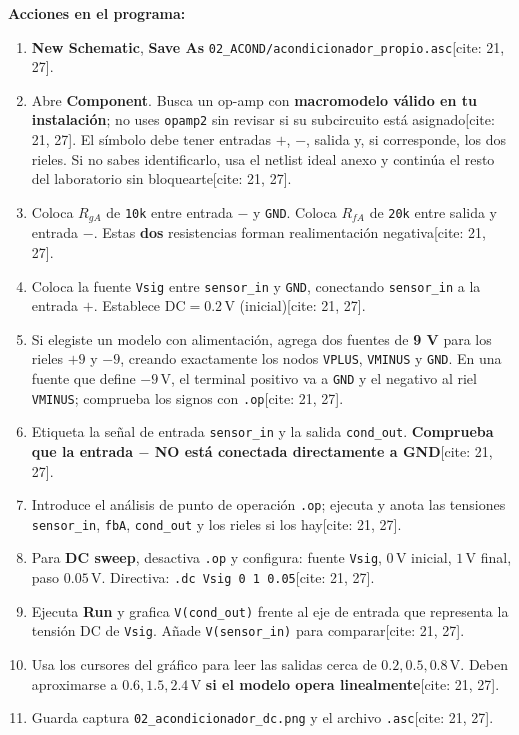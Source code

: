 \documentclass[10pt, a4paper]{article}
\begin{document}
\textbf{Acciones en el programa:}
\begin{enumerate}[noitemsep, leftmargin=*]
    \item \textbf{New Schematic}, \textbf{Save As} \texttt{02\_ACOND/acondicionador\_propio.asc}[cite: 21, 27].
    \item Abre \textbf{Component}. Busca un op-amp con \textbf{macromodelo válido en tu instalación}; no uses \texttt{opamp2} sin revisar si su subcircuito está asignado[cite: 21, 27]. El símbolo debe tener entradas $+$, $-$, salida y, si corresponde, los dos rieles. Si no sabes identificarlo, usa el netlist ideal anexo y continúa el resto del laboratorio sin bloquearte[cite: 21, 27].
    \item Coloca $R_{gA}$ de \texttt{10k} entre entrada $-$ y \texttt{GND}. Coloca $R_{fA}$ de \texttt{20k} entre salida y entrada $-$. Estas \textbf{dos} resistencias forman realimentación negativa[cite: 21, 27].
    \item Coloca la fuente \texttt{Vsig} entre \texttt{sensor\_in} y \texttt{GND}, conectando \texttt{sensor\_in} a la entrada $+$. Establece $\text{DC} = 0.2\,\text{V}$ (inicial)[cite: 21, 27].
    \item Si elegiste un modelo con alimentación, agrega dos fuentes de \textbf{9 V} para los rieles $+9$ y $-9$, creando exactamente los nodos \texttt{VPLUS}, \texttt{VMINUS} y \texttt{GND}. En una fuente que define $-9\,\text{V}$, el terminal positivo va a \texttt{GND} y el negativo al riel \texttt{VMINUS}; comprueba los signos con \texttt{.op}[cite: 21, 27].
    \item Etiqueta la señal de entrada \texttt{sensor\_in} y la salida \texttt{cond\_out}. \textbf{Comprueba que la entrada $-$ NO está conectada directamente a GND}[cite: 21, 27].
    \item Introduce el análisis de punto de operación \texttt{.op}; ejecuta y anota las tensiones \texttt{sensor\_in}, \texttt{fbA}, \texttt{cond\_out} y los rieles si los hay[cite: 21, 27].
    \item Para \textbf{DC sweep}, desactiva \texttt{.op} y configura: fuente \texttt{Vsig}, $0\,\text{V}$ inicial, $1\,\text{V}$ final, paso $0.05\,\text{V}$. Directiva: \texttt{.dc Vsig 0 1 0.05}[cite: 21, 27].
    \item Ejecuta \textbf{Run} y grafica \texttt{V(cond\_out)} frente al eje de entrada que representa la tensión DC de \texttt{Vsig}. Añade \texttt{V(sensor\_in)} para comparar[cite: 21, 27].
    \item Usa los cursores del gráfico para leer las salidas cerca de $0.2, 0.5, 0.8\,\text{V}$. Deben aproximarse a $0.6, 1.5, 2.4\,\text{V}$ \textbf{si el modelo opera linealmente}[cite: 21, 27].
    \item Guarda captura \texttt{02\_acondicionador\_dc.png} y el archivo \texttt{.asc}[cite: 21, 27].
\end{enumerate}
\end{document}
